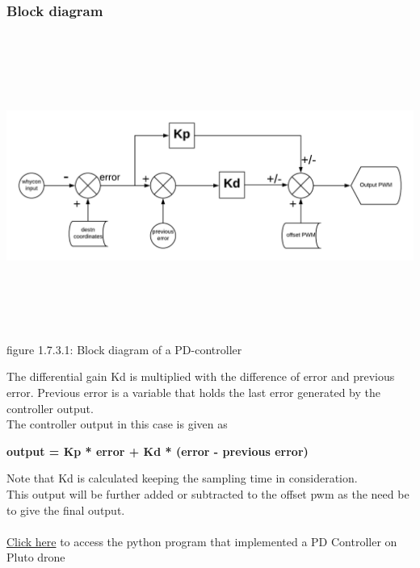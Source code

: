 \documentclass[a4paper,12pt,oneside]{book}
\begin{document}
\subsubsection{\textbf{Block diagram}}
\begin{flushleft}
\includegraphics[width = 15cm , height= 10cm]{PD.png}
figure 1.7.3.1: Block diagram of a PD-controller
\end{flushleft}
The differential gain Kd is multiplied with the difference of error and previous error. Previous error is a variable that holds the last error generated by the controller output.\\
The controller output in this case is given as 
\begin{center}
\textbf{output  = Kp * error + Kd * (error - previous error)}  \\ 
\end{center} 
Note that Kd is calculated keeping the sampling time in consideration.\\
This output will be further  added or subtracted to the offset pwm as the need be to give the final output.\\ \\
\href{https://github.com/eYSIP-2018/Autotuning-of-Controller-For-Drone/blob/karthik/PD-controller.py}{Click here} to access the python program that implemented a PD Controller on Pluto drone\\
\end{document}

